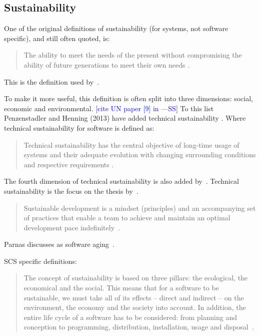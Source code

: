 \documentclass[12pt]{article}
\newcommand{\authornote}[3]{\textcolor{#1}{[#3 ---#2]}}
\newcommand{\authornote}[3]{}
\newcommand{\wss}[1]{\authornote{blue}{SS}{#1}} %
\begin{document}
\subsection{Sustainability}

One of the original definitions of sustainability (for systems, not software
specific), and still often quoted, is:

\begin{quotation}
\noindent The ability to meet the needs of the present without compromising the ability of
future generations to meet their own needs \cite{Brundtland1987}.
\end{quotation}

This is the definition used by~\cite{IISD2019}.

To make it more useful, this definition is often split into three dimensions:
social, economic and environmental. \wss{cite UN paper [9] in
  \cite{PenzenstadlerAndHenning2013}}  To this list Penzenstadler and Henning
(2013) have added technical sustainability \cite{PenzenstadlerAndHenning2013}.
Where technical sustainability for software is defined as:

\begin{quotation}
\noindent Technical sustainability has the central objective of long-time
usage of systems and their adequate evolution with changing surrounding
conditions and respective requirements \cite{PenzenstadlerAndHenning2013}.
\end{quotation}

The fourth dimension of technical sustainability is also added
by~\cite{WolframEtAl2017}.  Technical sustainability is the focus on the thesis
by~\cite{Hygerth2016}.

\begin{quotation}
  \noindent Sustainable development is a mindset (principles) and an
  accompanying set of practices that enable a team to achieve and maintain an
  optimal development pace indefinitely~\cite{Tate2005}.
\end{quotation}

Parnas discusses as software aging~\cite{Parnas1994a}.

SCS specific definitions:

\begin{quotation}
  \noindent The concept of sustainability is based on three pillars: the
  ecological, the economical and the social. This means that for a software to
  be sustainable, we must take all of its effects -- direct and indirect -- on
  the environment, the economy and the society into account. In addition, the
  entire life cycle of a software has to be considered: from planning and
  conception to programming, distribution, installation, usage and
  disposal~\cite{Heine2017}.
\end{quotation}
\end{document}
